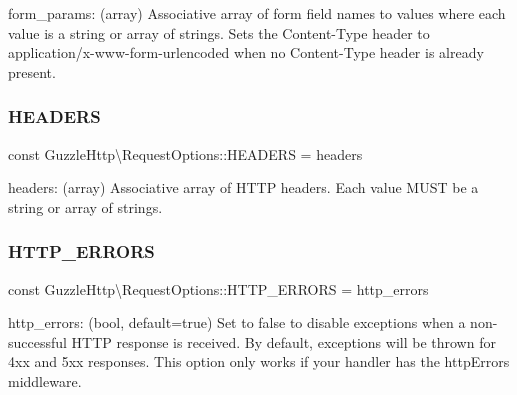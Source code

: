 form\+\_\+params\+: (array) Associative array of form field names to values where each value is a string or array of strings. Sets the Content-\/\+Type header to application/x-\/www-\/form-\/urlencoded when no Content-\/\+Type header is already present. \mbox{\label{classGuzzleHttp_1_1RequestOptions_a73db8d440c90d9e05d9fd77a890fa974}} 
\subsubsection{\texorpdfstring{H\+E\+A\+D\+E\+RS}{HEADERS}}
{\footnotesize\ttfamily const Guzzle\+Http\textbackslash{}\+Request\+Options\+::\+H\+E\+A\+D\+E\+RS = \textquotesingle{}headers\textquotesingle{}}

headers\+: (array) Associative array of H\+T\+TP headers. Each value M\+U\+ST be a string or array of strings. \mbox{\label{classGuzzleHttp_1_1RequestOptions_a8df7862e071288b6a58f9795d65137eb}} 
\subsubsection{\texorpdfstring{H\+T\+T\+P\+\_\+\+E\+R\+R\+O\+RS}{HTTP\_ERRORS}}
{\footnotesize\ttfamily const Guzzle\+Http\textbackslash{}\+Request\+Options\+::\+H\+T\+T\+P\+\_\+\+E\+R\+R\+O\+RS = \textquotesingle{}http\+\_\+errors\textquotesingle{}}

http\+\_\+errors\+: (bool, default=true) Set to false to disable exceptions when a non-\/ successful H\+T\+TP response is received. By default, exceptions will be thrown for 4xx and 5xx responses. This option only works if your handler has the {\ttfamily http\+Errors} middleware. \mbox{\label{classGuzzleHttp_1_1RequestOptions_a616e6ffe29f1640d5df6c5ff05cc7fa8}} 
